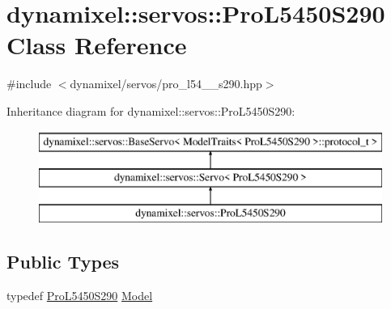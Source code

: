\hypertarget{classdynamixel_1_1servos_1_1_pro_l5450_s290}{}\section{dynamixel\+:\+:servos\+:\+:Pro\+L5450\+S290 Class Reference}
\label{classdynamixel_1_1servos_1_1_pro_l5450_s290}


{\ttfamily \#include $<$dynamixel/servos/pro\+\_\+l54\+\_\+\_\+s290.\+hpp$>$}

Inheritance diagram for dynamixel\+:\+:servos\+:\+:Pro\+L5450\+S290\+:\begin{figure}[H]
\begin{center}
\leavevmode
\includegraphics[height=3.000000cm]{classdynamixel_1_1servos_1_1_pro_l5450_s290}
\end{center}
\end{figure}
\subsection*{Public Types}
\begin{DoxyCompactItemize}
\item 
typedef \hyperlink{classdynamixel_1_1servos_1_1_pro_l5450_s290}{Pro\+L5450\+S290} \hyperlink{classdynamixel_1_1servos_1_1_pro_l5450_s290_ab9651979710f048d7cc9397fde588f21}{Model}
\end{DoxyCompactItemize}
